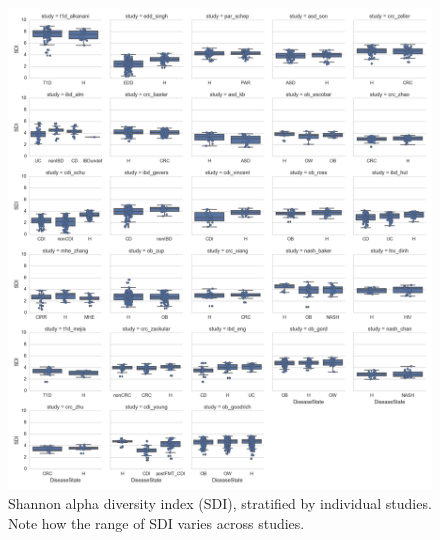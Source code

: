 \documentclass[12pt]{article}
\begin{document}
\newpage
\begin{figure}[h]
\begin{center}
	\includegraphics[scale=0.45]{alpha_diversity_by_study}
	\caption{Shannon alpha diversity index (SDI), stratified by individual studies. Note how the range of SDI varies across studies.}
	\label{fig:alpha_all}
\end{center}
\end{figure}
\end{document}

